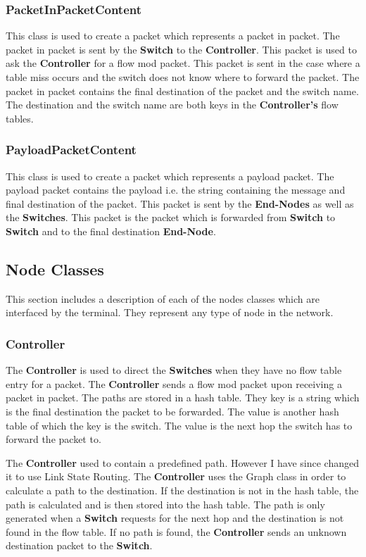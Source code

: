 \documentclass{article}
\begin{document}
\subsubsection{PacketInPacketContent}
This class is used to create a packet which represents a packet in packet. The
packet in packet is sent by the \textbf{Switch} to the \textbf{Controller}.
This packet is used to ask the \textbf{Controller} for a flow mod packet. This
packet is sent in the case where a table miss occurs and the switch does not
know where to forward the packet. The packet in packet contains the final
destination of the packet and the switch name. The destination and the switch
name are both keys in the \textbf{Controller's} flow tables.

\subsubsection{PayloadPacketContent}
This class is used to create a packet which represents a payload packet. The
payload packet contains the payload i.e. the string containing the message and
final destination of the packet. This packet is sent by the \textbf{End-Nodes}
as well as the \textbf{Switches}. This packet is the packet which is forwarded
from \textbf{Switch} to \textbf{Switch} and to the final destination
\textbf{End-Node}.

\subsection{Node Classes}
This section includes a description of each of the nodes classes which are
interfaced by the terminal. They represent any type of node in the network.

\subsubsection{Controller}
The \textbf{Controller} is used to direct the \textbf{Switches} when they have
no flow table entry for a packet. The \textbf{Controller} sends a flow mod
packet upon receiving a packet in packet. The paths are stored in a hash table.
They key is a string which is the final destination the packet to be forwarded.
The value is another hash table of which the key is the switch. The value is the
next hop the switch has to forward the packet to.

The \textbf{Controller} used to contain a predefined path. However I have since
changed it to use Link State Routing. The \textbf{Controller} uses the Graph
class in order to calculate a path to the destination. If the destination is not
in the hash table, the path is calculated and is then stored into the hash table.
The path is only generated when a \textbf{Switch} requests for the next hop and
the destination is not found in the flow table. If no path is found, the
\textbf{Controller} sends an unknown destination packet to the \textbf{Switch}.
\end{document}

